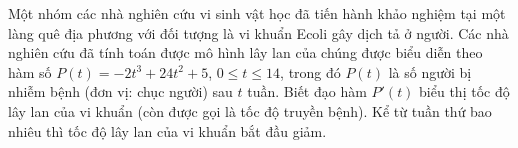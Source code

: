 \begin{bt}%
	Một nhóm các nhà nghiên cứu vi sinh vật học đã tiến hành khảo nghiệm tại một làng quê địa phương với đối tượng là vi khuẩn Ecoli gây dịch tả ở người. Các nhà nghiên cứu đã tính toán được mô hình lây lan của chúng được biểu diễn theo hàm số $P\left(t \right)=-2t^3+24t^2+5$, $0\le t\le 14$, trong đó $P(t)$ là số người bị nhiễm bệnh (đơn vị: chục người) sau $t$ tuần. Biết đạo hàm $P'\left(t \right)$ biểu thị tốc độ lây lan của vi khuẩn (còn được gọi là tốc độ truyền bệnh). Kể từ tuần thứ bao nhiêu thì tốc độ lây lan của vi khuẩn bắt đầu giảm.
\end{bt}

